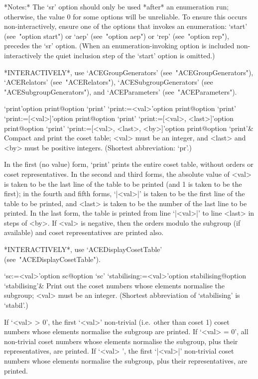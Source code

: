 *Notes:*
The `sr' option should  only  be  used  *after*  an  enumeration  run;
otherwise, the value 0 for some options will be unreliable. To  ensure
this occurs non-interactively, ensure one of the options that  invokes
an enumeration: `start' (see~"option  start")  or  `aep'  (see~"option
aep") or `rep' (see~"option rep"), precedes the `sr' option. (When  an
enumeration-invoking option is included  non-interactively  the  quiet
inclusion step of the `start' option is omitted.)

*INTERACTIVELY*, use `ACEGroupGenerators'  (see~"ACEGroupGenerators"),
`ACERelators'   (see~"ACERelators"),   `ACESubgroupGenerators'    (see
"ACESubgroupGenerators"), and `ACEParameters' (see~"ACEParameters").

\>`print'{option print}@{option `print'}
\>`print:=<val>'{option print}@{option `print'}
\>`print:=[<val>]'{option print}@{option `print'}
\>`print:=[<val>, <last>]'{option print}@{option `print'}
\>`print:=[<val>, <last>, <by>]'{option print}@{option `print'}&
Compact and print the coset table;  <val>  must  be  an  integer,  and
<last> and <by> must be positive integers.
(Shortest abbreviation: `pr'.)

In the first (no value) form, `print' prints the entire  coset  table,
without orders or coset  representatives.  In  the  second  and  third
forms, the absolute value of <val> is taken to be the last line of the
table to be printed (and 1 is taken to be the first);  in  the  fourth
and fifth forms, `|<val>|' is taken to be the first line of the  table
to be printed, and <last> is taken to be the number of the  last  line
to be printed. In the last  form,  the  table  is  printed  from  line
`|<val>|' to line <last> in steps of <by>. If <val> is negative,  then
the  orders   modulo   the   subgroup   (if   available)   and   coset
representatives are printed also.

*INTERACTIVELY*,              use               `ACEDisplayCosetTable'
(see~"ACEDisplayCosetTable").

\>`sc:=<val>'{option sc}@{option `sc'}
\>`stabilising:=<val>'{option stabilising}@{option `stabilising'}&
Print out the coset numbers whose elements normalise the subgroup; 
<val> must be an integer.
(Shortest abbreviation of `stabilising' is `stabil'.)

If `<val> > 0', the first `<val>' non-trivial (i.e.~other  than  coset
1) coset numbers whose elements normalise the subgroup are printed. If
`<val> = 0', all non-trivial coset numbers  whose  elements  normalise
the subgroup, plus their representatives, are printed.  If  `<val>  ', the first  `|<val>|'  non-trivial  coset  numbers  whose  elements
normalise the subgroup, plus their representatives, are printed.

